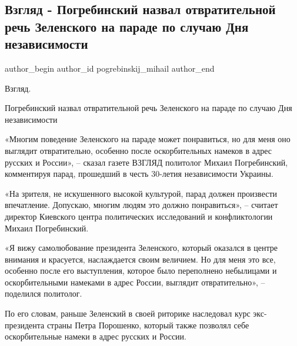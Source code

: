  
 
 
 
 
 
\subsection{Взгляд - Погребинский назвал отвратительной речь Зеленского на параде по случаю Дня независимости}
\label{sec:25_08_2021.fb.pogrebinskij_mihail.1.vzgljad_zelenskii_rechj_parad}
 
\ifcmt
 author_begin
   author_id pogrebinskij_mihail
 author_end
\fi

Взгляд.

Погребинский назвал отвратительной речь Зеленского на параде по случаю Дня
независимости

«Многим поведение Зеленского на параде может понравиться, но для меня оно
выглядит отвратительно, особенно после оскорбительных намеков в адрес русских и
России», – сказал газете ВЗГЛЯД политолог Михаил Погребинский, комментируя
парад, прошедший в честь 30-летия независимости Украины.

«На зрителя, не искушенного высокой культурой, парад должен произвести
впечатление. Допускаю, многим людям это должно понравиться», – считает директор
Киевского центра политических исследований и конфликтологии Михаил
Погребинский.

«Я вижу самолюбование президента Зеленского, который оказался в центре внимания
и красуется, наслаждается своим величием. Но для меня это все, особенно после
его выступления, которое было переполнено небылицами и оскорбительными намеками
в адрес России, выглядит отвратительно», – поделился политолог.

По его словам, раньше Зеленский в своей риторике наследовал курс экс-президента
страны Петра Порошенко, который также позволял себе оскорбительные намеки в
адрес русских и России.

